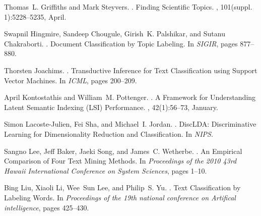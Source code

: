 \documentclass[11pt]{article}
\begin{document}
\begin{thebibliography}{10}
Thomas~L. Griffiths and Mark Steyvers.
.
\newblock Finding Scientific Topics.
, 101(suppl. 1):5228--5235, April.

Swapnil Hingmire, Sandeep Chougule, Girish~K. Palshikar, and Sutanu
  Chakraborti.
.
\newblock Document Classification by Topic Labeling.
\newblock In {\em SIGIR}, pages 877--880.

Thorsten Joachims.
.
\newblock Transductive Inference for Text Classification using Support Vector
  Machines.
\newblock In {\em ICML}, pages 200--209.

April Kontostathis and William~M. Pottenger.
.
\newblock A Framework for Understanding Latent Semantic Indexing (LSI)
  Performance.
, 42(1):56--73, January.

Simon Lacoste-Julien, Fei Sha, and Michael~I. Jordan.
.
\newblock DiscLDA: Discriminative Learning for Dimensionality Reduction and
  Classification.
\newblock In {\em NIPS}.

Sangno Lee, Jeff Baker, Jaeki Song, and James~C. Wetherbe.
.
\newblock An Empirical Comparison of Four Text Mining Methods.
\newblock In {\em Proceedings of the 2010 43rd Hawaii International Conference
  on System Sciences}, pages 1--10.

Bing Liu, Xiaoli Li, Wee~Sun Lee, and Philip~S. Yu.
.
\newblock Text Classification by Labeling Words.
\newblock In {\em Proceedings of the 19th national conference on Artifical
  intelligence}, pages 425--430.



\end{thebibliography}
\end{document}
